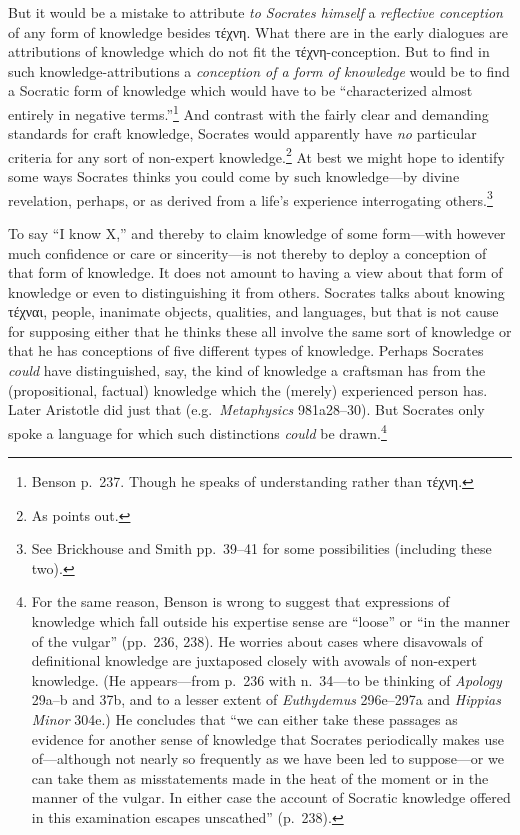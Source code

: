 \documentclass[11pt,letterpaper,oneside]{amsart} %
\begin{document}
But it would be a mistake to attribute \emph{to Socrates himself} a \emph{reflective conception} of any form of knowledge besides τέχνη. What there are in the early dialogues are attributions of knowledge which do not fit the τέχνη-conception. But to find in such knowledge-attributions a \emph{conception of a form of knowledge} would be to find a Socratic form of knowledge which would have to be ``characterized almost entirely in negative terms.''\footnote{Benson p.\ 237. Though he speaks of understanding rather than τέχνη.} And contrast with the fairly clear and demanding standards for craft knowledge, Socrates would apparently have \emph{no} particular criteria for any sort of non-expert knowledge.\footnote{As \citet[p.\ 77]{woodruff1990pse} points out.} At best we might hope to identify some ways Socrates thinks you could come by such knowledge---by divine revelation, perhaps, or as derived from a life's experience interrogating others.\footnote{See Brickhouse and Smith pp.~39--41 for some possibilities (including these two).}

To say ``I know X,'' and thereby to claim knowledge of some form---with however much confidence or care or sincerity---is not thereby to deploy a conception of that form of knowledge. It does not amount to having a view about that form of knowledge or even to distinguishing it from others. Socrates talks about knowing τέχναι, people, inanimate objects, qualities, and languages, but that is not cause for supposing either that he thinks these all involve the same sort of knowledge or that he has conceptions of five different types of knowledge. Perhaps Socrates \emph{could} have distinguished, say, the kind of knowledge a craftsman has from the (propositional, factual) knowledge which the (merely) experienced person has. Later Aristotle did just that (e.g.\ \emph{Metaphysics} 981a28--30). But Socrates only spoke a language for which such distinctions \emph{could} be drawn.\footnote{For the same reason, Benson is wrong to suggest that expressions of knowledge which fall outside his expertise sense are ``loose'' or ``in the manner of the vulgar'' (pp.\ 236, 238). He worries about cases where disavowals of definitional knowledge are juxtaposed closely with avowals of non-expert knowledge. (He appears---from p.~236 with n.\ 34---to be thinking of \emph{Apology} 29a--b and 37b, and to a lesser extent of \emph{Euthydemus} 296e--297a and \emph{Hippias Minor} 304e.) He concludes that ``we can either take these passages as evidence for another sense of knowledge that Socrates periodically makes use of---although not nearly so frequently as we have been led to suppose---or we can take them as misstatements made in the heat of the moment or in the manner of the vulgar. In either case the account of Socratic knowledge offered in this examination escapes unscathed'' (p.\ 238).} 
\end{document}
